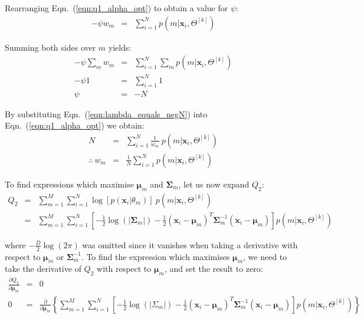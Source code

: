 \documentclass[10pt,a4paper]{article}
\def\Vec#1{{\boldsymbol{#1}}}
\def\Mat#1{{\boldsymbol{#1}}}
\begin{document}
\noindent
Rearranging Eqn.~(\ref{eqn:q1_alpha_opt}) to obtain a value for $\psi$:
%
\begin{eqnarray}
	-\psi w_m & = & \sum\nolimits_{i=1}^{N} p(m|\Vec{x}_i, \Theta^{[k]})
\end{eqnarray}

\noindent
Summing both sides over $m$ yields:
%
\begin{eqnarray}
	-\psi \sum\nolimits_m w_m & = & \sum\nolimits_{i=1}^{N} \sum\nolimits_m p(m|\Vec{x}_i, \Theta^{[k]}) \\
	-\psi 1 & = & \sum\nolimits_{i=1}^{N} 1 \\
	\psi & =  & -N	\label{eqn:lambda_equals_negN}
\end{eqnarray}

\noindent
By substituting Eqn.~(\ref{eqn:lambda_equals_negN}) into Eqn.~(\ref{eqn:q1_alpha_opt}) we obtain:
%
\begin{eqnarray}
			N & = & \sum\nolimits_{i=1}^{N} \frac{1}{w_m} ~ p(m|\Vec{x}_i, \Theta^{[k]}) \\
	\therefore ~ w_m & = & \frac{1}{N} \sum\nolimits_{i=1}^{N} p(m|\Vec{x}_i, \Theta^{[k]}) 
	\label{eqn:alpha_m_solved}
\end{eqnarray}

\noindent
To find expressions which maximise $\Vec{\mu}_m$ and $\Mat{\Sigma}_m$, let us now expand $Q_2$:
%
\begin{eqnarray}
	Q_2 & = &   \sum\nolimits_{m=1}^{M}	\sum\nolimits_{i=1}^{N} \log[  p(\Vec{x}_i | \theta_m) ] ~ p(m|\Vec{x}_i, \Theta^{[k]}) 	\\
	 ~  & = &   \sum\nolimits_{m=1}^{M} \sum\nolimits_{i=1}^{N} \left[
					- \frac{1}{2} \log(|\Mat{\Sigma}_m|) - \frac{1}{2} (\Vec{x}_i - \Vec{\mu}_m)^T \Mat{\Sigma}_m^{-1} (\Vec{x}_i - \Vec{\mu}_m)
					\right] p(m|\Vec{x}_i, \Theta^{[k]})  \label{eqn:q2_expanded}
\end{eqnarray}

\noindent
where $-\frac{D}{2} \log(2\pi)$ was omitted since it vanishes when taking a derivative with respect to $\Vec{\mu}_m$ or $\Mat{\Sigma}^{-1}_m$.
To find the expression which maximises $\Vec{\mu}_m$, we need to take the derivative of $Q_2$ with respect to $\Vec{\mu}_m$, and set the result to zero:
%
\begin{eqnarray}
	\frac{\partial Q_2}{\partial \Vec{\mu}_m} & = & 0   \\
 0 & = & \frac{\partial}{\partial \Vec{\mu}_m} \left\{ \sum\nolimits_{m=1}^{M} \sum\nolimits_{i=1}^{N} \left[
					- \frac{1}{2} \log(|\Sigma_m|) - \frac{1}{2} (\Vec{x}_i - \Vec{\mu}_m)^T \Mat{\Sigma}_m^{-1} (\Vec{x}_i - \Vec{\mu}_m)
					\right] p(m|\Vec{x}_i, \Theta^{[k]}) \right\} ~~~ ~~~ ~~~  \label{eqn:q2_mu_partone}
\end{eqnarray}%
\end{document}
